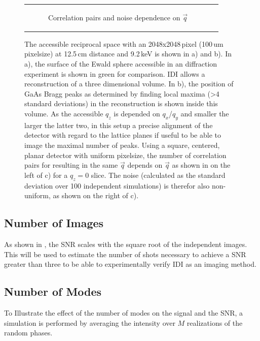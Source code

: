 \begin{figure}[!htb]
\begin{tabular}[t]{cc}
\begin{subfigure}{0.52\textwidth}
	\caption{Correlation pairs and noise dependence on $\vec{q}$ } 
\end{subfigure}\\
	\end{tabular}
	\caption[Accessible reciprocal space]{The accessible reciprocal space with an 2048x2048\,pixel (100\,um pixelsize) at 12.5\,cm distance and 9.2\,keV is shown in a) and b). In a), the surface of the Ewald sphere accessible in an diffraction experiment is shown in green for comparison. IDI allows a reconstruction of a three dimensional volume. In b), the position of GaAs Bragg peaks as determined by finding local maxima (>4 standard deviations) in the reconstruction is shown inside this volume. As the accessible $q_z$ is depended on $q_x$/$q_y$ and smaller the larger the latter two, in this setup a precise alignment of the detector with regard to the lattice planes if useful to be able to image the maximal number of peaks. Using a square, centered, planar detector with uniform pixelsize, the number of correlation pairs for resulting in the same $\vec{q}$ depends on $\vec{q}$ as shown in on the left of c) for a $q_z=0$ slice. The noise (calculated as the standard deviation over 100 independent simulations) is therefor also non-uniform, as shown on the right of c).}
	
\end{figure}



\subsection{Number of Images}
As shown in , the SNR scales with  the square root of the independent images. This will be used to estimate the number of shots necessary to achieve a SNR greater than three to be able to experimentally verify IDI as an imaging method.
 
\subsection{Number of Modes}
To Illustrate the effect of the number of modes on the signal and the SNR, a simulation is performed by averaging the intensity over $M$ realizations of the random phases.  

